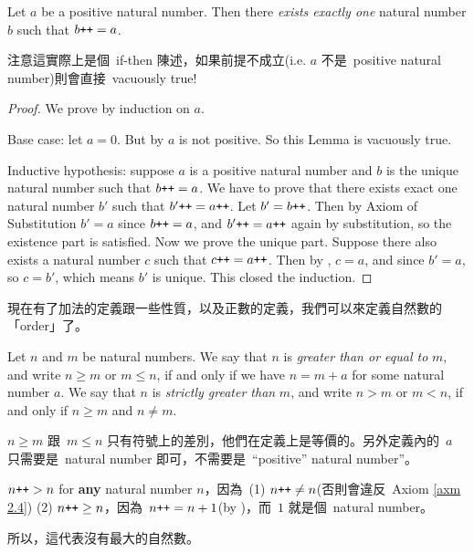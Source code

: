\begin{lemma}\label{lem 2.2.10}
Let \(a\) be a positive natural number. Then there \emph{exists exactly one} natural number \(b\) such that \(b\texttt{++} = a\).
\end{lemma}
\begin{note}
注意這實際上是個\ if-then 陳述，如果前提不成立(i.e. \(a\) 不是\ positive natural number)則會直接\ vacuously true!
\end{note}
\begin{proof}
We prove by induction on \(a\).

Base case: let \(a = 0\). But by  \(a\) is not positive. So this Lemma is vacuously true.

Inductive hypothesis: suppose \(a\) is a positive natural number and \(b\) is the unique natural number such that \(b\texttt{++} = a\). We have to prove that there exists exact one natural number \(b'\) such that \(b'\texttt{++} = a\texttt{++}\).
Let \(b' = b\texttt{++}\). Then by Axiom of Substitution  \(b' = a\) since \(b\texttt{++} = a\), and \(b'\texttt{++} = a\texttt{++}\) again by substitution, so the existence part is satisfied.
Now we prove the unique part. Suppose there also exists a natural number \(c\) such that \(c\texttt{++} = a\texttt{++}\). Then by , \(c = a\), and since \(b' = a\), so \(c = b'\), which means \(b'\) is unique. This closed the induction.
\end{proof}

\begin{note}
現在有了加法的定義跟一些性質，以及正數的定義，我們可以來定義自然數的「order」了。
\end{note}

\begin{definition} \label{def 2.2.11}
Let \(n\) and \(m\) be natural numbers. We say that \(n\) is \emph{greater than or equal to} \(m\), and write \(n \geq m\) or \(m \leq n\), if and only if we have \(n = m + a\) for some natural number \(a\). We say that \(n\) is \emph{strictly greater than} \(m\), and write \(n > m\) or \(m < n\), if and only if \(n \geq m\) and \(n \neq m\).
\end{definition}
\begin{note}
\(n \geq m\) 跟\ \(m \leq n\) 只有符號上的差別，他們在定義上是等價的。另外定義內的\ \(a\) 只需要是\ natural number 即可，不需要是\ ``positive'' natural number''。
\end{note}
\begin{additional corollary} \label{ac 2.2.3}
\(n\texttt{++} > n\) for \textbf{any} natural number \(n\)，因為\ (1) \(n\texttt{++} \neq n\)(否則會違反\ Axiom \ref{axm 2.4}) (2) \(n\texttt{++} \geq n\)，因為\ \(n\texttt{++} = n + 1\)(by )，而\ \(1\) 就是個\ natural number。

所以，這代表沒有最大的自然數。
\end{additional corollary}


